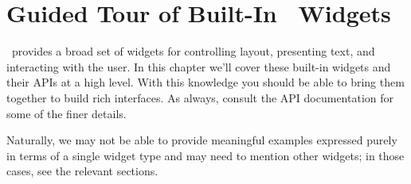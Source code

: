 \chapter{Guided Tour of Built-In \vtyui\ Widgets}
\label{chap:guided_tour}

\vtyui\ provides a broad set of widgets for controlling layout,
presenting text, and interacting with the user.  In this chapter we'll
cover these built-in widgets and their APIs at a high level.  With
this knowledge you should be able to bring them together to build rich
interfaces.  As always, consult the API documentation for some of the
finer details.

Naturally, we may not be able to provide meaningful examples expressed
purely in terms of a single widget type and may need to mention other
widgets; in those cases, see the relevant sections.



















